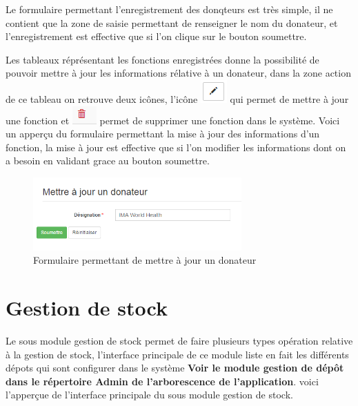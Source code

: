 \documentclass[12pt,a4paper]{report}
\begin{document}
Le formulaire permettant l'enregistrement des donqteurs est très simple, il ne contient que la zone de saisie permettant de renseigner le nom du donateur, et l'enregistrement est effective que si l'on clique sur le bouton soumettre. 

Les tableaux réprésentant les fonctions enregistrées donne la possibilité de pouvoir mettre à jour les informations rélative à un donateur, dans la zone action de ce tableau on retrouve deux icônes, l'icône \includegraphics[scale=0.7]{pic/EditBlack.png} qui permet de mettre à jour une fonction et \includegraphics[scale=0.7]{pic/DeleteWRed.png} permet de supprimer une fonction dans le système.
Voici un apperçu du formulaire permettant la mise à jour des informations d'un fonction, la mise à jour est effective que si l'on modifier les informations dont on a besoin en validant grace au bouton soumettre. 

\begin{figure}[h]
\begin{center}
\includegraphics[width=8cm]{pic/UpdateDonor.png}
\end{center}
\caption{Formulaire permettant de mettre à jour un donateur}
\label{Formulaire permettant de mettre à jour un donateur}
\end{figure} 

\newpage
\section{Gestion de stock}
Le sous module gestion de stock permet de faire plusieurs types opération relative à la gestion de stock, l'interface principale de ce module liste en fait les différents dépots qui sont configurer dans le système \textbf{Voir le module gestion de dépôt dans le répertoire Admin de l'arborescence de l'application}. voici l'apperçue de l'interface principale du sous module gestion de stock.
\end{document}
